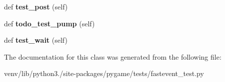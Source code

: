 \begin{DoxyCompactItemize}
def {\bfseries test\+\_\+post} (self)
\item 
\mbox{\label{classpygame_1_1tests_1_1fastevent__test_1_1_fastevent_module_test_a8effc3b1c36be3fab1fe96c9b63b0f69}} 
def {\bfseries todo\+\_\+test\+\_\+pump} (self)
\item 
\mbox{\label{classpygame_1_1tests_1_1fastevent__test_1_1_fastevent_module_test_a074a08e1320290681eb0dae64c59788a}} 
def {\bfseries test\+\_\+wait} (self)
\end{DoxyCompactItemize}


The documentation for this class was generated from the following file\+:\begin{DoxyCompactItemize}
\item 
venv/lib/python3./site-\/packages/pygame/tests/fastevent\+\_\+test.\+py\end{DoxyCompactItemize}
